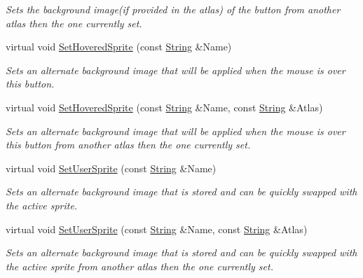 \begin{DoxyCompactItemize}
\begin{DoxyCompactList}\small\item\em Sets the background image(if provided in the atlas) of the button from another atlas then the one currently set. \item\end{DoxyCompactList}\item 
virtual void \hyperlink{classphys_1_1UI_1_1Button_a12cfac0dcc6324694f29968c0ca25d03}{SetHoveredSprite} (const \hyperlink{namespacephys_aa03900411993de7fbfec4789bc1d392e}{String} \&Name)
\begin{DoxyCompactList}\small\item\em Sets an alternate background image that will be applied when the mouse is over this button. \item\end{DoxyCompactList}\item 
virtual void \hyperlink{classphys_1_1UI_1_1Button_abf5f5997d71829bd7902139932a4b26b}{SetHoveredSprite} (const \hyperlink{namespacephys_aa03900411993de7fbfec4789bc1d392e}{String} \&Name, const \hyperlink{namespacephys_aa03900411993de7fbfec4789bc1d392e}{String} \&Atlas)
\begin{DoxyCompactList}\small\item\em Sets an alternate background image that will be applied when the mouse is over this button from another atlas then the one currently set. \item\end{DoxyCompactList}\item 
virtual void \hyperlink{classphys_1_1UI_1_1Button_a8c3a5657daf79a882f71691e91785d4d}{SetUserSprite} (const \hyperlink{namespacephys_aa03900411993de7fbfec4789bc1d392e}{String} \&Name)
\begin{DoxyCompactList}\small\item\em Sets an alternate background image that is stored and can be quickly swapped with the active sprite. \item\end{DoxyCompactList}\item 
virtual void \hyperlink{classphys_1_1UI_1_1Button_aeb5ec136d8f307c5380c407f066b2ac1}{SetUserSprite} (const \hyperlink{namespacephys_aa03900411993de7fbfec4789bc1d392e}{String} \&Name, const \hyperlink{namespacephys_aa03900411993de7fbfec4789bc1d392e}{String} \&Atlas)
\begin{DoxyCompactList}\small\item\em Sets an alternate background image that is stored and can be quickly swapped with the active sprite from another atlas then the one currently set. \item\end{DoxyCompactList}\item 

\end{DoxyCompactItemize}
